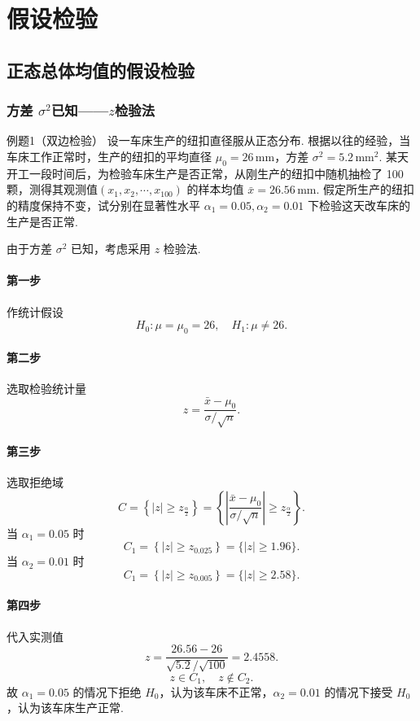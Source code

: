 \section{假设检验}


\subsection{正态总体均值的假设检验}


\subsubsection{方差 \texorpdfstring{$\sigma^2$}{σ²}已知——\texorpdfstring{$z$}{z}检验法}

\begin{question}{例题1（双边检验）}
    设一车床生产的纽扣直径服从正态分布. 根据以往的经验，当车床工作正常时，生产的纽扣的平均直径 $\mu_0 = 26 \,\mathrm{mm}$，方差 $\sigma^2 = 5.2 \,\mathrm{mm^2}$. 某天开工一段时间后，为检验车床生产是否正常，从刚生产的纽扣中随机抽检了 100 颗，测得其观测值$(x_1, x_2, \cdots , x_{100})$ 的样本均值 $\bar{x} = 26.56 \,\mathrm{mm}$. 假定所生产的纽扣的精度保持不变，试分别在显著性水平 $\alpha_1 = 0.05, \alpha_2 = 0.01$ 下检验这天改车床的生产是否正常.
\end{question}
\begin{solution}
    由于方差 $\sigma^2$ 已知，考虑采用 $z$ 检验法.
    \paragraph{第一步} 作统计假设
    $$
        H_0: \mu = \mu_0 = 26, \quad H_1: \mu \neq 26.
    $$
    \paragraph{第二步} 选取检验统计量
    $$
        z = \frac{\bar{x}-\mu_0}{\sigma/\sqrt{n}} .
    $$
    \paragraph{第三步} 选取拒绝域
    $$
        C = \left\{ |z| \geqslant z_{\frac{\alpha}{2}}\right\}
        = \left\{\left|\frac{\bar{x}-\mu_0}{\sigma/\sqrt{n}}\right| \geqslant z_{\frac{\alpha}{2}}\right\}.
    $$
    当 $\alpha_1 = 0.05$ 时
    $$
        C_1 = \left\{|z| \geqslant z_{0.025}\right\} = \{|z| \geqslant 1.96\}.
    $$
    当 $\alpha_2 = 0.01$ 时
    $$
        C_1 = \left\{|z| \geqslant z_{0.005}\right\} = \{|z| \geqslant 2.58\}.
    $$
    \paragraph{第四步} 代入实测值
    $$
        z = \frac{26.56-26}{\sqrt{5.2}/\sqrt{100}} = 2.4558.
    $$
    $$
        z \in C_1, \quad z \notin C_2.
    $$
    故 $\alpha_1 = 0.05$ 的情况下拒绝 $H_0$，认为该车床不正常，$\alpha_2 = 0.01$ 的情况下接受 $H_0$，认为该车床生产正常.
\end{solution}



